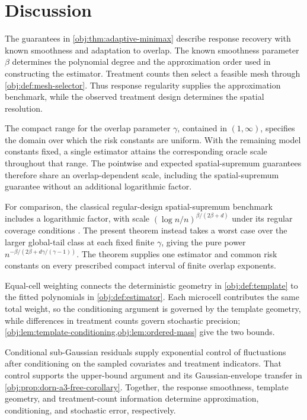 \section{Discussion}

The guarantees in \cref{obj:thm:adaptive-minimax} describe response recovery with known smoothness and adaptation to overlap. The known smoothness parameter \(\beta\) determines the polynomial degree and the approximation order used in constructing the estimator. Treatment counts then select a feasible mesh through \cref{obj:def:mesh-selector}. Thus response regularity supplies the approximation benchmark, while the observed treatment design determines the spatial resolution.

The compact range for the overlap parameter \(\gamma\), contained in \((1,\infty)\), specifies the domain over which the risk constants are uniform. With the remaining model constants fixed, a single estimator attains the corresponding oracle scale throughout that range. The pointwise and expected spatial-supremum guarantees therefore share an overlap-dependent scale, including the spatial-supremum guarantee without an additional logarithmic factor.

For comparison, the classical regular-design spatial-supremum benchmark includes a logarithmic factor, with scale \((\log n/n)^{\beta/(2\beta+d)}\) under its regular coverage conditions \citep{Stone1982}. The present theorem instead takes a worst case over the larger global-tail class at each fixed finite \(\gamma\), giving the pure power \(n^{-\beta/(2\beta+d\gamma/(\gamma-1))}\). The theorem supplies one estimator and common risk constants on every prescribed compact interval of finite overlap exponents.

Equal-cell weighting connects the deterministic geometry in \cref{obj:def:template} to the fitted polynomials in \cref{obj:def:estimator}. Each microcell contributes the same total weight, so the conditioning argument is governed by the template geometry, while differences in treatment counts govern stochastic precision; \cref{obj:lem:template-conditioning,obj:lem:ordered-mass} give the two bounds.

Conditional sub-Gaussian residuals supply exponential control of fluctuations after conditioning on the sampled covariates and treatment indicators. That control supports the upper-bound argument and its Gaussian-envelope transfer in \cref{obj:prop:dorn-a3-free-corollary}. Together, the response smoothness, template geometry, and treatment-count information determine approximation, conditioning, and stochastic error, respectively.

